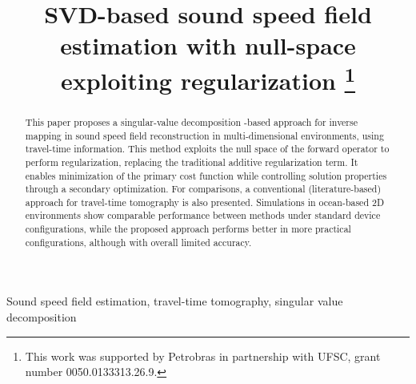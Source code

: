 \title{SVD-based sound speed field estimation with null-space exploiting regularization
	\thanks{This work was supported by Petrobras in partnership with UFSC, grant number 0050.0133313.26.9.}
	}
%

\author{
	\and
    \and
    \and
{}
    }

\maketitle

\begin{abstract}
    This paper proposes a singular-value decomposition -based approach for inverse mapping in sound speed field reconstruction in multi-dimensional environments, using travel-time information. This method exploits the null space of the forward operator to perform regularization, replacing the traditional additive regularization term. It enables minimization of the primary cost function while controlling solution properties through a secondary optimization. For comparisons, a conventional (literature-based) approach for travel-time tomography is also presented. Simulations in ocean-based 2D environments show comparable performance between methods under standard device configurations, while the proposed approach performs better in more practical configurations, although with overall limited accuracy.
\end{abstract}

\begin{IEEEkeywords}
	Sound speed field estimation, travel-time tomography, singular value decomposition
\end{IEEEkeywords}